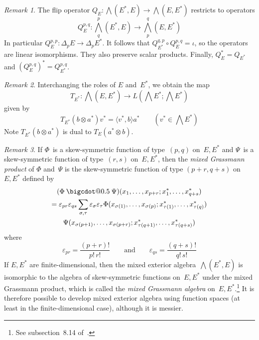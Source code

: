 \documentclass[letterpaper,12pt]{article}
\makeatletter
\newcommand{\bigcdot}[1]{\mathbin{\mathpalette\bigcdot@{#1}}}
\newcommand{\bigcdot@}[2]{%
  \sbox0{$#1\vcenter{}$}%
  \sbox2{$#1\cdot\m@th$}%
  \hbox{%
    \hfil
    \raise\ht0\hbox{%
      \scalebox{#2}{%
        \lower\ht0\hbox{$#1\bullet\m@th$}%
      }%
    }%
    \hfil
  }%
}
\newcommand{\after}{\circ}
\newcommand{\tprod}{\otimes}
\newcommand{\bigeprod}{\bigwedge}
\newcommand{\medeprod}{{\textstyle\bigeprod}}
\newcommand{\mprod}{\bigcdot{0.5}}
\newcommand{\sprod}[2]{\langle#1,#2\rangle}
\newcommand{\sign}[1]{\varepsilon_{#1}}
\theoremstyle{definition}
\theoremstyle{remark}
\newtheorem*{rmk}{Remark}
\makeatother
\begin{document}
\begin{rmk}
The flip operator \(Q_E:\medeprod(E^*,E)\to\medeprod(E,E^*)\) restricts to operators
\[Q_E^{p,q}:\medeprod^p_q(E^*,E)\to\medeprod^q_p(E,E^*)\]
In particular \(Q_E^{p,p}:\Delta_p E\to\Delta_p E^*\). It follows that \(Q_{E^*}^{q,p}\after Q_E^{p,q}=\iota\), so the operators are linear isomorphisms. They also preserve scalar products. Finally, \(Q_E^*=Q_{E^*}\) and \((Q_E^{p,q})^*=Q_{E^*}^{p,q}\).
\end{rmk}

\begin{rmk}
Interchanging the roles of \(E\) and~\(E^*\), we obtain the map
\[T_{E^*}:\medeprod(E,E^*)\to L(\medeprod E^*;\medeprod E^*)\]
given by
\[T_{E^*}(b\tprod a^*)v^*=\sprod{v^*}{b}a^*\qquad(v^*\in\medeprod E^*)\]
Note \(T_{E^*}(b\tprod a^*)\) is dual to \(T_E(a^*\tprod b)\).
\end{rmk}

\begin{rmk}
If \(\Phi\)~is a skew-symmetric function of type~\((p,q)\) on~\(E,E^*\) and \(\Psi\)~is a skew-symmetric function of type~\((r,s)\) on~\(E,E^*\), then the \emph{mixed Grassmann product} of \(\Phi\) and~\(\Psi\) is the skew-symmetric function of type \((p+r,q+s)\) on~\(E,E^*\) defined by
\begin{multline*}
(\Phi\mprod\Psi)(x_1,\ldots,x_{p+r};x^*_1,\ldots,x^*_{q+s})\\
	=\varepsilon_{pr}\varepsilon_{qs}\sum_{\sigma,\tau}\sign{\sigma}\sign{\tau}\Phi(x_{\sigma(1)},\ldots,x_{\sigma(p)};x^*_{\tau(1)},\ldots,x^*_{\tau(q)})\\
		\Psi(x_{\sigma(p+1)},\ldots,x_{\sigma(p+r)};x^*_{\tau(q+1)},\ldots,x^*_{\tau(q+s)})
\end{multline*}
where
\[\varepsilon_{pr}=\frac{(p+r)!}{p!\,r!}\qquad\text{and}\qquad\varepsilon_{qs}=\frac{(q+s)!}{q!\,s!}\]
If \(E,E^*\) are finite-dimensional, then the mixed exterior algebra~\(\medeprod(E^*,E)\) is isomorphic to the algebra of skew-symmetric functions on~\(E,E^*\) under the mixed Grassmann product, which is called the \emph{mixed Grassmann algebra} on~\(E,E^*\).\footnote{See subsection~8.14 of~\cite{greub3}.} It is therefore possible to develop mixed exterior algebra using function spaces (at least in the finite-dimensional case), although it is messier.
\end{rmk}
\end{document}
